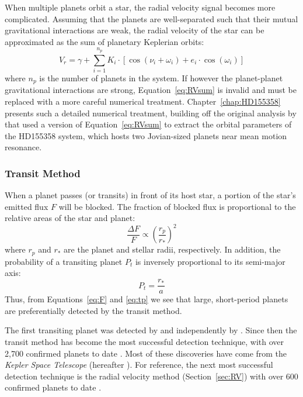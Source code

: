 When multiple planets orbit a star, the radial velocity signal becomes more complicated.
Assuming that the planets are well-separated such that their mutual gravitational interactions are weak, the radial velocity of the star can be approximated as the sum of planetary Keplerian orbits:
\begin{equation}
V_r = \gamma + \sum_{i=1}^{n_p} K_i \cdot [\cos(\nu_i + \omega_i) + e_i\cdot \cos(\omega_i)]
\label{eq:RVsum}
\end{equation}
where $n_p$ is the number of planets in the system. 
If however the planet-planet gravitational interactions are strong, Equation~\ref{eq:RVsum} is invalid and must be replaced with a more careful numerical treatment. 
Chapter~\ref{chap:HD155358} presents such a detailed numerical treatment, building off the original analysis by \citet{Robertson2012} that used a version of Equation~\ref{eq:RVsum} to extract the orbital parameters of the HD155358 system, which hosts two Jovian-sized planets near mean motion resonance. 

\subsubsection{Transit Method}
\label{sec:transit}
When a planet passes (or transits) in front of its host star, a portion of the star's emitted flux $F$ will be blocked. 
The fraction of blocked flux is proportional to the relative areas of the star and planet:
\begin{equation}
\frac{\Delta F}{F} \propto \left(\frac{r_p}{r_*}\right)^2
\label{eq:F}
\end{equation}
where $r_p$ and $r_*$ are the planet and stellar radii, respectively. 
In addition, the probability of a transiting planet $P_t$ is inversely proportional to its semi-major axis:
\begin{equation}
P_t = \frac{r_*}{a}
\label{eq:tp}
\end{equation}
Thus, from Equations~\ref{eq:F} and \ref{eq:tp} we see that large, short-period planets are preferentially detected by the transit method.

The first transiting planet was detected by \citet{Henry1999} and independently by \citet{Charbonneau2000}.
Since then the transit method has become the most successful detection technique, with over 2,700 confirmed planets to date \citep{NASAEA}. 
Most of these discoveries have come from the \textit{Kepler Space Telescope} (hereafter \kep).
For reference, the next most successful detection technique is the radial velocity method (Section~\ref{sec:RV}) with over 600 confirmed planets to date \citep{NASAEA}.


